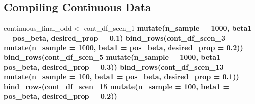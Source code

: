 \documentclass[
]{article}
\newenvironment{Shaded}{\begin{snugshade}}{\end{snugshade}}
\newcommand{\DataTypeTok}[1]{\textcolor[rgb]{0.13,0.29,0.53}{#1}}
\newcommand{\DecValTok}[1]{\textcolor[rgb]{0.00,0.00,0.81}{#1}}
\newcommand{\FloatTok}[1]{\textcolor[rgb]{0.00,0.00,0.81}{#1}}
\newcommand{\KeywordTok}[1]{\textcolor[rgb]{0.13,0.29,0.53}{\textbf{#1}}}
\newcommand{\NormalTok}[1]{#1}
\newcommand{\OperatorTok}[1]{\textcolor[rgb]{0.81,0.36,0.00}{\textbf{#1}}}
\newcommand{\StringTok}[1]{\textcolor[rgb]{0.31,0.60,0.02}{#1}}
\begin{document}
\begin{Shaded}
\end{Shaded}

\hypertarget{compiling-continuous-data}{%
\subsection{Compiling Continuous Data}\label{compiling-continuous-data}}

\begin{Shaded}
\begin{Highlighting}[]
\NormalTok{continuous_final_odd <-}\StringTok{ }
\StringTok{  }\NormalTok{cont_df_scen_}\DecValTok{1} \OperatorTok{%>%}\StringTok{ }
\StringTok{    }\KeywordTok{mutate}\NormalTok{(}\DataTypeTok{n_sample =} \DecValTok{1000}\NormalTok{, }\DataTypeTok{beta1 =}\NormalTok{ pos_beta, }\DataTypeTok{desired_prop =} \FloatTok{0.1}\NormalTok{) }\OperatorTok{%>%}\StringTok{ }
\StringTok{  }\KeywordTok{bind_rows}\NormalTok{(cont_df_scen_}\DecValTok{3} \OperatorTok{%>%}\StringTok{ }
\StringTok{              }\KeywordTok{mutate}\NormalTok{(}\DataTypeTok{n_sample =} \DecValTok{1000}\NormalTok{, }\DataTypeTok{beta1 =}\NormalTok{ pos_beta, }\DataTypeTok{desired_prop =} \FloatTok{0.2}\NormalTok{)) }\OperatorTok{%>%}\StringTok{ }
\StringTok{  }\KeywordTok{bind_rows}\NormalTok{(cont_df_scen_}\DecValTok{5} \OperatorTok{%>%}\StringTok{ }
\StringTok{              }\KeywordTok{mutate}\NormalTok{(}\DataTypeTok{n_sample =} \DecValTok{1000}\NormalTok{, }\DataTypeTok{beta1 =}\NormalTok{ pos_beta, }\DataTypeTok{desired_prop =} \FloatTok{0.3}\NormalTok{)) }\OperatorTok{%>%}\StringTok{ }
\StringTok{  }\KeywordTok{bind_rows}\NormalTok{(cont_df_scen_}\DecValTok{13} \OperatorTok{%>%}\StringTok{ }
\StringTok{              }\KeywordTok{mutate}\NormalTok{(}\DataTypeTok{n_sample =} \DecValTok{100}\NormalTok{, }\DataTypeTok{beta1 =}\NormalTok{ pos_beta, }\DataTypeTok{desired_prop =} \FloatTok{0.1}\NormalTok{)) }\OperatorTok{%>%}\StringTok{ }
\StringTok{  }\KeywordTok{bind_rows}\NormalTok{(cont_df_scen_}\DecValTok{15} \OperatorTok{%>%}\StringTok{ }
\StringTok{              }\KeywordTok{mutate}\NormalTok{(}\DataTypeTok{n_sample =} \DecValTok{100}\NormalTok{, }\DataTypeTok{beta1 =}\NormalTok{ pos_beta, }\DataTypeTok{desired_prop =} \FloatTok{0.2}\NormalTok{)) }\OperatorTok{%>%}\StringTok{ }
}}}}}}}}}}
\end{Highlighting}
\end{Shaded}
\end{document}
